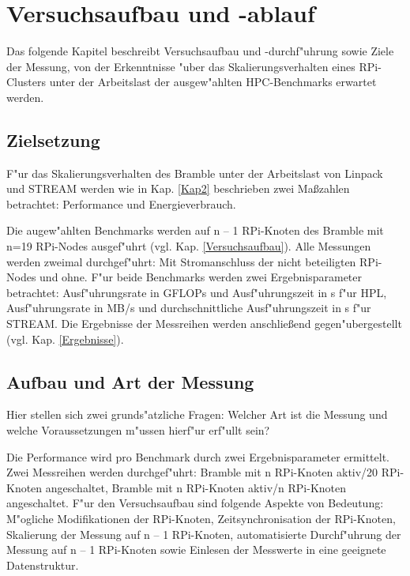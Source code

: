 \chapter{Versuchsaufbau und -ablauf}\label{Kap3}

Das folgende Kapitel beschreibt Versuchsaufbau und -durchf"uhrung sowie Ziele der Messung, von der Erkenntnisse "uber das Skalierungsverhalten eines RPi-Clusters unter der Arbeitslast der ausgew"ahlten HPC-Benchmarks erwartet werden. 

\section{Zielsetzung}\label{Ziel}

F"ur das Skalierungsverhalten des Bramble unter der Arbeitslast von Linpack und STREAM werden wie in Kap. \ref{Kap2} beschrieben zwei Ma\ss zahlen betrachtet: Performance und Energieverbrauch.

Die augew"ahlten Benchmarks werden auf n -- 1 RPi-Knoten des Bramble mit n=19 RPi-Nodes ausgef"uhrt (vgl. Kap. \ref{Versuchsaufbau}). Alle Messungen werden zweimal durchgef"uhrt: Mit Stromanschluss der nicht beteiligten RPi-Nodes und ohne. F"ur beide Benchmarks werden zwei Ergebnisparameter betrachtet: Ausf"uhrungsrate in GFLOPs und Ausf"uhrungszeit in s f"ur HPL, Ausf"uhrungsrate in MB/s und durchschnittliche Ausf"uhrungszeit in s f"ur STREAM. Die Ergebnisse der Messreihen werden anschlie\ss end gegen"ubergestellt (vgl. Kap. \ref{Ergebnisse}). 

\section{Aufbau und Art der Messung}\label{Aufbau}

Hier stellen sich zwei grunds"atzliche Fragen: Welcher Art ist die Messung und welche Voraussetzungen m"ussen hierf"ur erf"ullt sein? 

Die Performance wird pro Benchmark durch zwei Ergebnisparameter ermittelt. Zwei Mess\-reihen werden durchgef"uhrt: Bramble mit n RPi-Knoten aktiv/20 RPi-Knoten angeschaltet, Bramble mit n RPi-Knoten aktiv/n RPi-Knoten angeschaltet. 
F"ur den Versuchsaufbau sind folgende Aspekte von Bedeutung: M"ogliche Modifikationen der RPi-Knoten, Zeitsynchronisation der RPi-Knoten, Skalierung der Messung auf n -- 1 RPi-Knoten, automatisierte Durchf"uhrung der Messung auf n -- 1 RPi-Knoten sowie Einlesen der Messwerte in eine geeignete Datenstruktur. 

